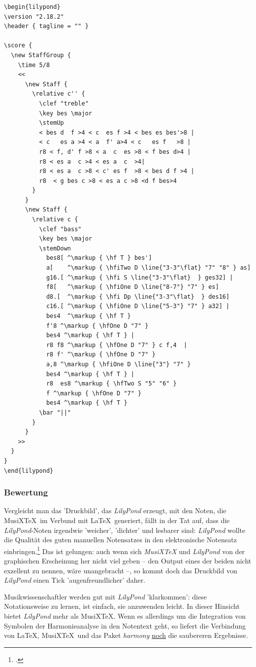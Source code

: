 \begin{verbatim}
\begin{lilypond}
\version "2.18.2"
\header { tagline = "" }

\score {
  \new StaffGroup {
    \time 5/8
    <<
      \new Staff {
        \relative c'' {
          \clef "treble"
          \key bes \major  
          \stemUp
          < bes d  f >4 < c  es f >4 < bes es bes'>8 |
          < c   es a >4 < a  f' a>4 < c   es f   >8 |         
          r8 < f, d' f >8 < a  c  es >8 < f bes d>4 |
          r8 < es a  c >4 < es a  c  >4|
          r8 < es a  c >8 < c' es f  >8 < bes d f >4 |
          r8  < g bes c >8 < es a c >8 <d f bes>4
        }   
      }
      \new Staff {
        \relative c { 
          \clef "bass"
          \key bes \major  
          \stemDown
            bes8[ ^\markup { \hf T } bes']
            a[    ^\markup { \hfiTwo D \line{"3-3"\flat} "7" "8" } as] 
            g16.[ ^\markup { \hfi S \line{"3-3"\flat}  } ges32] |
            f8[   ^\markup { \hfiOne D \line{"8-7"} "7" } es] 
            d8.[  ^\markup { \hfi Dp \line{"3-3"\flat}  } des16] 
            c16.[ ^\markup { \hfiOne D \line{"5-3"} "7" } a32] | 
            bes4  ^\markup { \hf T } 
            f'8 ^\markup { \hfOne D "7" } 
            bes4 ^\markup { \hf T } |
            r8 f8 ^\markup { \hfOne D "7" } c f,4  | 
            r8 f' ^\markup { \hfOne D "7" } 
            a,8 ^\markup { \hfiOne D \line{"3"} "7" } 
            bes4 ^\markup { \hf T } | 
            r8  es8 ^\markup { \hfTwo S "5" "6" } 
            f ^\markup { \hfOne D "7" } 
            bes4 ^\markup { \hf T }
          \bar "||"
        }   
      }
    >>
  }
}
\end{lilypond}
\end{verbatim}

\subsubsection{Bewertung}

Vergleicht man das 'Druckbild', das \textit{LilyPond} erzeugt, mit den Noten,
die MusiX\TeX\ im Verbund mit \LaTeX\ generiert, fällt in der Tat auf, dass die
\textit{LilyPond}-Noten irgendwie 'weicher', 'dichter' und lesbarer sind:
\textit{LilyPond} wollte die Qualität des guten manuellen Notensatzes in den
elektronische Notensatz einbringen.\footcite[vgl.][8ff]{LilyPond2018d} Das ist
gelungen: auch wenn sich \textit{MusiX\TeX} und \textit{LilyPond} von der
graphischen Erscheinung her nicht viel geben -- den Output eines der beiden
nicht exzellent zu nennen, wäre unangebracht --, so kommt doch das Druckbild von
\textit{LilyPond} einen Tick 'augenfreundlicher' daher.

Musikwissenschaftler werden gut mit \textit{LilyPond} 'klarkommen': diese
Notationsweise zu lernen, ist einfach, sie anzuwenden leicht. In dieser Hinsicht
bietet \textit{LilyPond} mehr als MusiX\TeX. Wenn es allerdings um die Integration
von Symbolen der Harmonieanalyse in den Notentext geht, so liefert die
Verbindung von \LaTeX, MusiX\TeX\ und das Paket \textit{harmony} \underline{noch} die
saubereren Ergebnisse.



%
